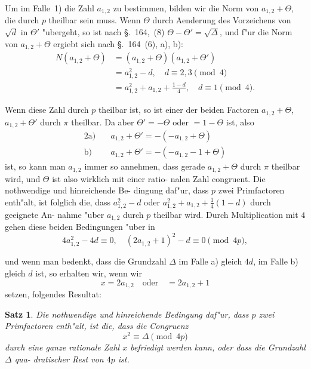 \documentclass[12pt,a4paper]{article}
\theoremstyle{weber}
\newtheorem*{satz}{Satz}
\begin{document}
Um im Falle~1) die Zahl $a_{1,2}$ zu bestimmen, bilden wir die
Norm von $a_{1,2} + \varTheta$, die durch $p$ theilbar sein muss. Wenn $\varTheta$
durch Aenderung des Vorzeichens von $\sqrt{d}$ in $\varTheta'$ "ubergeht, so ist
nach \S.~164,~(8) $\varTheta - \varTheta' = \sqrt{\varDelta}$, und f"ur die Norm von $a_{1,2} + \varTheta$
ergiebt sich nach \S.~164~(6), a), b):
\begin{equation}\label{eq:s165-4}
\begin{aligned}
N(a_{1,2} + \varTheta) &= (a_{1,2} + \varTheta)(a_{1,2} + \varTheta') \\
&= a_{1,2}^2 - d, \quad d \equiv 2, 3 \pmod{4} \\
&= a_{1,2}^2 + a_{1,2} + \frac{1-d}{4}, \quad d \equiv 1 \pmod{4}.
\end{aligned}
\end{equation}

Wenn diese Zahl durch $p$ theilbar ist, so ist einer der
beiden Factoren $a_{1,2} + \varTheta$, $a_{1,2} + \varTheta'$ durch $\pi$ theilbar. Da aber
$\varTheta' = -\varTheta$ oder $= 1 - \varTheta$ ist, also
\begin{alignat*}{2}
\text{a)}\quad & a_{1,2} + \varTheta' = -(-a_{1,2} + \varTheta) \\
\text{b)}\quad & a_{1,2} + \varTheta' = -(-a_{1,2} - 1 + \varTheta)
\end{alignat*}
ist, so kann man $a_{1,2}$ immer so annehmen, dass gerade $a_{1,2} + \varTheta$
durch $\pi$ theilbar wird, und $\varTheta$ ist also wirklich mit einer ratio-
nalen Zahl congruent. Die nothwendige und hinreichende Be-
dingung daf"ur, dass $p$ zwei Primfactoren enth"alt, ist folglich die,
dass $a_{1,2}^2 - d$ oder $a_{1,2}^2 + a_{1,2} + \frac{1}{4}(1-d)$ durch geeignete An-
nahme "uber $a_{1,2}$ durch $p$ theilbar wird. Durch Multiplication
mit $4$ gehen diese beiden Bedingungen "uber in
\[
4a_{1,2}^2 - 4d \equiv 0, \quad (2a_{1,2} + 1)^2 - d \equiv 0 \pmod{4p},
\]

und wenn man bedenkt, dass die Grundzahl $\varDelta$ im Falle a)
gleich $4d$, im Falle b) gleich $d$ ist, so erhalten wir, wenn wir
\begin{equation}\label{eq:s165-5}
x = 2a_{1,2} \quad \text{oder} \quad = 2a_{1,2} + 1
\end{equation}
setzen, folgendes Resultat:

\begin{satz}
Die nothwendige und hinreichende Bedingung
daf"ur, dass $p$ zwei Primfactoren enth"alt, ist
die, dass die Congruenz
\begin{equation}\label{eq:s165-6}
x^2 \equiv \varDelta \pmod{4p}
\end{equation}
durch eine ganze rationale Zahl $x$ befriedigt
werden kann, oder dass die Grundzahl $\varDelta$ qua-
dratischer Rest von $4p$ ist.
\end{satz}
\end{document}
